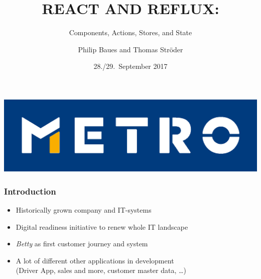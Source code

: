 \documentclass{beamer}
\begin{document}
\title[React and Reflux]{REACT AND REFLUX:}
\subtitle{Components, Actions, Stores, and State}
\author[P.\ Baues, T.\ Str\"oder]{Philip Baues and Thomas Str\"oder}
\date{28./29.\ September 2017}
\newcommand{\location}{\texttt{code.talks} Hamburg}

{
\begin{frame}[plain]
\centering
\includegraphics{metro2.png}
\end{frame}
}

{
\begin{frame}[plain]
\titlepage
\end{frame}
}

\begin{frame}\frametitle{Introduction}
\centering
\begin{itemize}
\item Historically grown company and IT-systems
\item Digital readiness initiative to renew whole IT landscape
\item \textit{Betty} as first customer journey and system
\item A lot of different other applications in development\\
(Driver App, sales and more, customer master data, …)
\end{itemize}
\end{frame}
\end{document}
